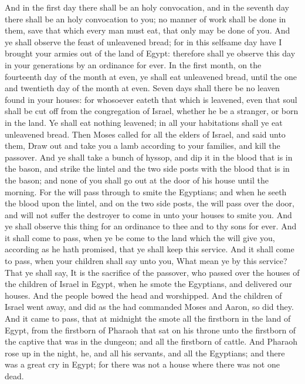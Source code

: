 \begin{biblechapter}
\verse And in the first day there shall be an holy convocation, and in the seventh day there shall be an holy convocation to you; no manner of work shall be done in them, save that which every man must eat, that only may be done of you.
\verse And ye shall observe the feast of unleavened bread; for in this selfsame day have I brought your armies out of the land of Egypt: therefore shall ye observe this day in your generations by an ordinance for ever.
\verse In the first month, on the fourteenth day of the month at even, ye shall eat unleavened bread, until the one and twentieth day of the month at even.
\verse Seven days shall there be no leaven found in your houses: for whosoever eateth that which is leavened, even that soul shall be cut off from the congregation of Israel, whether he be a stranger, or born in the land.
\verse Ye shall eat nothing leavened; in all your habitations shall ye eat unleavened bread.
\verse Then Moses called for all the elders of Israel, and said unto them, Draw out and take you a lamb according to your families, and kill the passover.
\verse And ye shall take a bunch of hyssop, and dip it in the blood that is in the bason, and strike the lintel and the two side posts with the blood that is in the bason; and none of you shall go out at the door of his house until the morning.
\verse For the \LORD will pass through to smite the Egyptians; and when he seeth the blood upon the lintel, and on the two side posts, the \LORD will pass over the door, and will not suffer the destroyer to come in unto your houses to smite you.
\verse And ye shall observe this thing for an ordinance to thee and to thy sons for ever.
\verse And it shall come to pass, when ye be come to the land which the \LORD will give you, according as he hath promised, that ye shall keep this service.
\verse And it shall come to pass, when your children shall say unto you, What mean ye by this service?
\verse That ye shall say, It is the sacrifice of the \LORDs passover, who passed over the houses of the children of Israel in Egypt, when he smote the Egyptians, and delivered our houses. And the people bowed the head and worshipped.
\verse And the children of Israel went away, and did as the \LORD had commanded Moses and Aaron, so did they.
\verse And it came to pass, that at midnight the \LORD smote all the firstborn in the land of Egypt, from the firstborn of Pharaoh that sat on his throne unto the firstborn of the captive that was in the dungeon; and all the firstborn of cattle.
\verse And Pharaoh rose up in the night, he, and all his servants, and all the Egyptians; and there was a great cry in Egypt; for there was not a house where there was not one dead.

\end{biblechapter}
